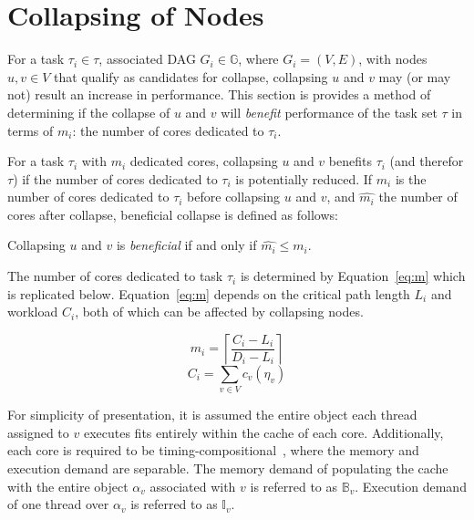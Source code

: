 \section{Collapsing of Nodes}
\label{sec:collapse-bound}

For a task ${\tau_i \in \tau}$, associated DAG
${G_i \in \mathbb{G}}$, where ${G_i = (V, E)}$, with nodes
${u,v \in V}$ that qualify as candidates for collapse, collapsing
${u}$ and ${v}$ may (or may not) result an increase in
performance. This section is provides a method of determining if the
collapse of ${u}$ and ${v}$ will \emph{benefit} performance of the
task set ${\tau}$ in terms of ${m_i}$: the number of cores
dedicated to ${\tau_i}$.

For a task ${\tau_i}$ with ${m_i}$ dedicated cores, collapsing
${u}$ and ${v}$ benefits ${\tau_i}$ (and therefor ${\tau}$) if the
number of cores dedicated to ${\tau_i}$ is potentially reduced. If
${m_i}$ is the number of cores dedicated to ${\tau_i}$ before
collapsing ${u}$ and ${v}$, and ${\hat{m_i}}$ the number of
cores after collapse, beneficial collapse is defined as follows: 

\begin{definition}
  Collapsing ${u}$ and ${v}$ is \emph{beneficial} if and only if
  ${\hat{m_i} \le m_i}$.
\end{definition}

The number of cores dedicated to task ${\tau_i}$ is determined by
Equation~\ref{eq:m} which is replicated below. Equation~\ref{eq:m}
depends on the critical path length ${L_i}$ and workload
${C_i}$, both of which can be affected by collapsing nodes.

\begin{multicols}{2}
  \begin{equation*}
    m_i = \left\lceil
      \frac{C_i - L_i}
           {D_i - L_i}
    \right\rceil
  \end{equation*}
  \begin{equation*}
    C_i = \sum_{v \in V} c_v(\eta_v)
  \end{equation*}
\end{multicols}

For simplicity of presentation, it is assumed the entire object each
thread assigned to ${v}$ executes fits entirely within the
cache of each core. Additionally, each core is required to be
timing-compositional~\addcite{}, where the memory and execution demand
are separable. The memory demand of populating the cache with the
entire object ${\alpha_v}$ associated with ${v}$ is referred to as
${\mathbb{B}_v}$. Execution demand of one thread over ${\alpha_v}$ is
referred to as ${\mathbb{I}_v}$. 

